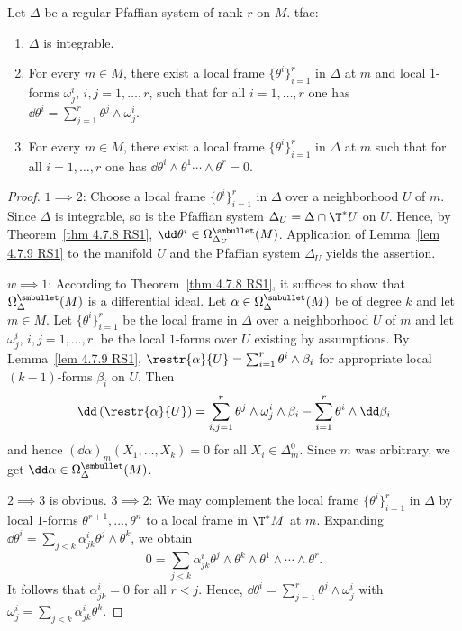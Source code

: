 \begin{thm}\label{prop 4.7.10 RS1}
    Let $\Delta$ be a regular Pfaffian system of rank $r$ on $M$. \gls{tfae}:
    \begin{enumerate}
        \item $\Delta$ is integrable.
        \item For every $m\in M$, there exist a local frame $\{\theta^i\}_{i=1}^r$ in $\Delta$ at $m$ and local $1$-forms $\omega_j^i$, $i,j=1,\ldots,r$, such that for all $i=1,\ldots,r$ one has $\dd\theta^i=\sum_{j=1}^r \theta^j\wedge \omega_j^i$.
        \item For every $m\in M$, there exist a local frame $\{\theta^i\}_{i=1}^r$ in $\Delta$ at $m$ such that for all $i=1,\ldots,r$ one has $\dd\theta^i\wedge \theta^1\cdots\wedge\theta^r=0$.
    \end{enumerate}
\end{thm}
\begin{proof}
    $1\implies2$: Choose a local frame $\{\theta^i\}_{i=1}^r$ in $\Delta$ over a neighborhood $U$ of $m$. Since $\Delta$ is integrable, so is the Pfaffian system $\Delta_U=\Delta\cap \T^\ast U$ on $U$. Hence, by Theorem~\ref{thm 4.7.8 RS1}, $\dd\theta^i\in\Omega^{\smbullet }_{\Delta_U}(M)$. Application of Lemma~\ref{lem 4.7.9 RS1} to the manifold $U$ and the Pfaffian system $\Delta_U$ yields the assertion.

    $w\implies1$: According to Theorem~\ref{thm 4.7.8 RS1}, it suffices to show that $\Omega^{\smbullet }_\Delta(M)$ is a differential ideal. Let $\alpha\in\Omega^{\smbullet }_\Delta(M)$ be of degree $k$ and let $m\in M$. Let $\{\theta^i\}_{i=1}^r$ be the local frame in $\Delta$ over a neighborhood $U$ of $m$ and let $\omega^i_j$, $i,j=1,\ldots,r$, be the local $1$-forms over $U$ existing by assumptions. By Lemma~\ref{lem 4.7.9 RS1}, $\restr{\alpha}{U}=\sum_{i=1}^r\theta^i\wedge\beta_i$ for appropriate local $(k-1)$-forms $\beta_i$ on $U$. Then
    \[\dd\left(\restr{\alpha}{U}\right)=\sum_{i,j=1}^r\theta^j\wedge\omega_j^i\wedge \beta_i-\sum_{i=1}^r \theta^i\wedge\dd \beta_i\]
    and hence $(\dd\alpha)_m(X_1,\ldots,X_k)=0$ for all $X_i\in\Delta_m^0$. Since $m$ was arbitrary, we get $\dd\alpha\in\Omega^{\smbullet }_\Delta(M)$.

    $2\implies3$ is obvious. $3\implies2$: We may complement the local frame $\{\theta^i\}_{i=1}^r$ in $\Delta$ by local $1$-forms $\theta^{r+1},\ldots,\theta^n$ to a local frame in $\T^\ast M$ at $m$. Expanding $\dd\theta^i=\sum_{j<k}\alpha^i_{jk}\theta^j\wedge\theta^k$, we obtain
    \[0=\sum_{j<k}\alpha^i_{jk}\theta^j\wedge\theta^k\wedge\theta^1\wedge\cdots\wedge\theta^r.\]
    It follows that $\alpha^i_{jk}=0$ for all $r<j$. Hence, $\dd\theta^i=\sum_{j=1}^r\theta^j\wedge\omega_j^i$ with $\omega^i_j=\sum_{j<k}\alpha^i_{jk}\theta^k$.
\end{proof}


